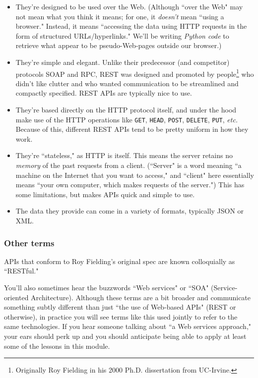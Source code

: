 \documentclass[12pt]{article}
\begin{document}
\begin{itemize}
\itemsep.1em

\item They're designed to be used over the Web. (Although ``over the Web" may
not mean what you think it means; for one, it \textit{doesn't} mean ``using a
browser." Instead, it means ``accessing the data using HTTP requests in the
form of structured URLs/hyperlinks." We'll be writing \textit{Python code} to
retrieve what appear to be pseudo-Web-pages outside our browser.)

\item They're simple and elegant. Unlike their predecessor (and competitor)
protocols SOAP and RPC, REST was designed and promoted by
people\footnote{Originally Roy Fielding in his 2000 Ph.D. dissertation from
UC-Irvine.} who didn't like clutter and who wanted communication to be
streamlined and compactly specified. REST APIs are typically nice to use.

\item They're based directly on the HTTP protocol itself, and under the hood
make use of the HTTP operations like \texttt{GET}, \texttt{HEAD},
\texttt{POST}, \texttt{DELETE}, \texttt{PUT}, \textit{etc.} Because of this,
different REST APIs tend to be pretty uniform in how they work.

\item They're ``stateless," as HTTP is itself. This means the server retains
no \textit{memory} of the past requests from a client. (``Server" is a word
meaning ``a machine on the Internet that you want to access," and ``client"
here essentially means ``your own computer, which makes requests of the
server.") This has some limitations, but makes APIs quick and simple to use.

\item The data they provide can come in a variety of formats, typically JSON
or XML.

\end{itemize}

\subsubsection{Other terms}

APIs that conform to Roy Fielding's original spec are known colloquially as
``RESTful." 

You'll also sometimes hear the buzzwords ``Web services" or ``SOA"
(Service-oriented Architecture). Although these terms are a bit broader and
communicate something subtly different than just ``the use of Web-based APIs"
(REST or otherwise), in practice you will see terms like this used jointly to
refer to the same technologies. If you hear someone talking about ``a Web
services approach," your ears should perk up and you should anticipate being
able to apply at least some of the lessons in this module.
\end{document}
